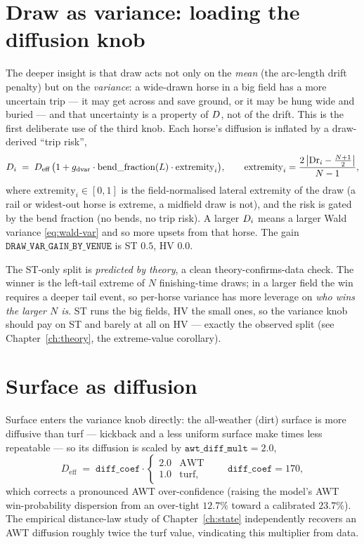 \section{Draw as variance: loading the diffusion knob}

The deeper insight is that draw acts not only on the \emph{mean} (the arc-length drift penalty) but
on the \emph{variance}: a wide-drawn horse in a big field has a more uncertain trip --- it may get
across and save ground, or it may be hung wide and buried --- and that uncertainty is a property of
$D$, not of the drift. This is the first deliberate use of the third knob. Each horse's
diffusion is inflated by a draw-derived ``trip risk'',
\begin{equation}
  D_i \;=\; D_{\text{eff}}\,\bigl(1 + g_{\text{dvar}}\cdot
   \mathrm{bend\_fraction}(L)\cdot \mathrm{extremity}_i\bigr),
  \qquad
  \mathrm{extremity}_i = \frac{2\,\bigl|\mathrm{Dr}_i - \tfrac{N+1}{2}\bigr|}{N-1},
  \label{eq:drawvar}
\end{equation}
where $\mathrm{extremity}_i\in[0,1]$ is the field-normalised lateral extremity of the draw (a
rail or widest-out horse is extreme, a midfield draw is not), and the risk is gated by the bend
fraction (no bends, no trip risk). A larger $D_i$ means a larger Wald variance
\eqref{eq:wald-var} and so more upsets from that horse. The gain
$\texttt{DRAW\_VAR\_GAIN\_BY\_VENUE}$ is ST $0.5$, HV $0.0$.

The ST-only split is \emph{predicted by theory}, a clean theory-confirms-data check. The winner is
the left-tail extreme of $N$ finishing-time draws; in a larger field the win requires a deeper tail
event, so per-horse variance has more leverage on \emph{who wins the larger $N$ is}. ST runs the
big fields, HV the small ones, so the variance knob should pay on ST and barely at all on HV ---
exactly the observed split (see Chapter~\ref{ch:theory}, the extreme-value corollary).

\section{Surface as diffusion}

Surface enters the variance knob directly: the all-weather (dirt) surface is more diffusive than
turf --- kickback and a less uniform surface make times less repeatable --- so its diffusion is
scaled by $\texttt{awt\_diff\_mult}=2.0$,
\begin{equation}
  D_{\text{eff}} \;=\; \texttt{diff\_coef}\cdot
   \begin{cases} 2.0 & \text{AWT}\\ 1.0 & \text{turf,}\end{cases}
   \qquad \texttt{diff\_coef}=170,
  \label{eq:awtdiff}
\end{equation}
which corrects a pronounced AWT over-confidence (raising the model's AWT win-probability dispersion
from an over-tight $12.7\%$ toward a calibrated $23.7\%$). The empirical distance-law study of
Chapter~\ref{ch:state} independently recovers an AWT diffusion roughly twice the turf value,
vindicating this multiplier from data.

